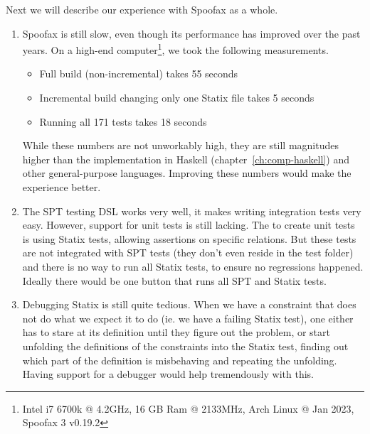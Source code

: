Next we will describe our experience with Spoofax as a whole. 

\begin{enumerate}
	\item Spoofax is still slow, even though its performance has improved over the past years. On a high-end computer\footnote{Intel i7 6700k @ 4.2GHz, 16 GB Ram @ 2133MHz, Arch Linux @ Jan 2023, Spoofax 3 v0.19.2}, we took the following measurements.
	\begin{itemize}
		\item Full build (non-incremental) takes 55 seconds
		\item Incremental build changing only one Statix file takes 5 seconds
		\item Running all 171 tests takes 18 seconds
	\end{itemize}
	While these numbers are not unworkably high, they are still magnitudes higher than the implementation in Haskell (chapter~\ref{ch:comp-haskell}) and other general-purpose languages. Improving these numbers would make the experience better.
	
	\item The SPT testing DSL works very well, it makes writing integration tests very easy. However, support for unit tests is still lacking. The to create unit tests is using Statix tests, allowing assertions on specific relations. But these tests are not integrated with SPT tests (they don't even reside in the test folder) and there is no way to run all Statix tests, to ensure no regressions happened. Ideally there would be one button that runs all SPT and Statix tests.
	
	\item Debugging Statix is still quite tedious. When we have a constraint that does not do what we expect it to do (ie. we have a failing Statix test), one either has to stare at its definition until they figure out the problem, or start unfolding the definitions of the constraints into the Statix test, finding out which part of the definition is misbehaving and repeating the unfolding. Having support for a debugger would help tremendously with this.
\end{enumerate}
